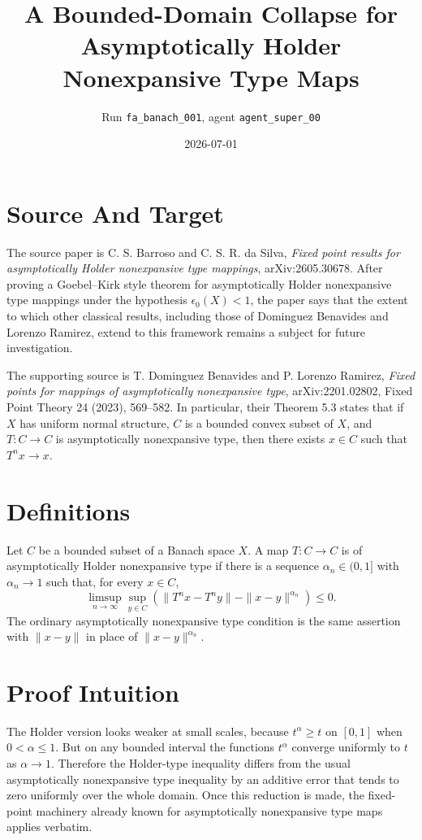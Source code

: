 \documentclass[11pt]{article}
\title{A Bounded-Domain Collapse for Asymptotically Holder Nonexpansive Type Maps}
\author{Run \texttt{fa\_banach\_001}, agent \texttt{agent\_super\_00}}
\date{2026-07-01}
\newcommand{\limsupn}{\limsup_{n\to\infty}}
\begin{document}
\maketitle

\section*{Source And Target}

The source paper is C. S. Barroso and C. S. R. da Silva,
\emph{Fixed point results for asymptotically Holder nonexpansive type
mappings}, arXiv:2605.30678.  After proving a Goebel--Kirk style theorem for
asymptotically Holder nonexpansive type mappings under the hypothesis
\(\epsilon_0(X)<1\), the paper says that the extent to which other classical
results, including those of Dominguez Benavides and Lorenzo Ramirez, extend to
this framework remains a subject for future investigation.

The supporting source is T. Dominguez Benavides and P. Lorenzo Ramirez,
\emph{Fixed points for mappings of asymptotically nonexpansive type},
arXiv:2201.02802, Fixed Point Theory 24 (2023), 569--582.  In particular,
their Theorem 5.3 states that if \(X\) has uniform normal structure, \(C\) is a
bounded convex subset of \(X\), and \(T:C\to C\) is asymptotically
nonexpansive type, then there exists \(x\in C\) such that \(T^n x\to x\).

\section*{Definitions}

Let \(C\) be a bounded subset of a Banach space \(X\). A map \(T:C\to C\) is
of asymptotically Holder nonexpansive type if there is a sequence
\(\alpha_n\in(0,1]\) with \(\alpha_n\to 1\) such that, for every \(x\in C\),
\[
\limsupn \sup_{y\in C}\left(\|T^n x-T^n y\|-\|x-y\|^{\alpha_n}\right)\le 0.
\]
The ordinary asymptotically nonexpansive type condition is the same assertion
with \(\|x-y\|\) in place of \(\|x-y\|^{\alpha_n}\).

\section*{Proof Intuition}

The Holder version looks weaker at small scales, because \(t^\alpha\ge t\) on
\([0,1]\) when \(0<\alpha\le 1\).  But on any bounded interval the functions
\(t^\alpha\) converge uniformly to \(t\) as \(\alpha\to 1\).  Therefore the
Holder-type inequality differs from the usual asymptotically nonexpansive type
inequality by an additive error that tends to zero uniformly over the whole
domain.  Once this reduction is made, the fixed-point machinery already known
for asymptotically nonexpansive type maps applies verbatim.
\end{document}
